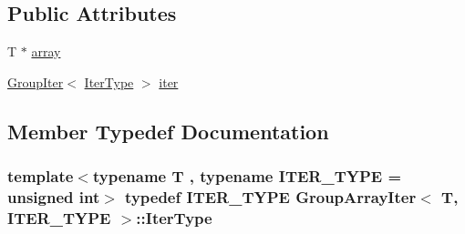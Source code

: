\subsection*{Public Attributes}
\begin{DoxyCompactItemize}
\item 
T $\ast$ \hyperlink{structGroupArrayIter_a66da0a8097f1b86ab15ae9172610861c}{array}
\item 
\hyperlink{structGroupIter}{Group\-Iter}$<$ \hyperlink{structGroupArrayIter_a61733327ff96821c9c80d63fa2c11337}{Iter\-Type} $>$ \hyperlink{structGroupArrayIter_a19527413babf9e9aeb2f219c0551eb1e}{iter}
\end{DoxyCompactItemize}


\subsection{Member Typedef Documentation}
\hypertarget{structGroupArrayIter_a61733327ff96821c9c80d63fa2c11337}{
\subsubsection[{Iter\-Type}]{\setlength{\rightskip}{0pt plus 5cm}template$<$typename T , typename I\-T\-E\-R\-\_\-\-T\-Y\-P\-E  = unsigned int$>$ typedef I\-T\-E\-R\-\_\-\-T\-Y\-P\-E {\bf Group\-Array\-Iter}$<$ T, I\-T\-E\-R\-\_\-\-T\-Y\-P\-E $>$\-::{\bf Iter\-Type}}}\label{structGroupArrayIter_a61733327ff96821c9c80d63fa2c11337}



